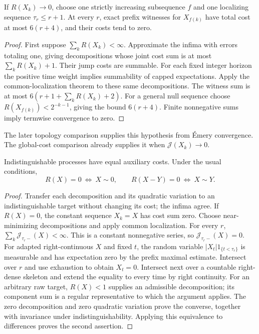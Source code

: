 \begin{lemma}
If $R(X_k)\to0$, choose one strictly increasing subsequence $f$ and one
localizing sequence $\tau_r\leq r+1$. At every $r$, exact prefix witnesses
for $X_{f(k)}$ have total cost at most $6(r+4)$, and their costs tend to zero.
\end{lemma}
\begin{proof}
First suppose $\sum_kR(X_k)<\infty$. Approximate the infima with errors
totaling one, giving decompositions whose joint cost sum is at most
$\sum_kR(X_k)+1$. Their jump costs are summable. For each fixed integer
horizon the positive time weight implies summability of capped expectations.
Apply the common-localization theorem to these same decompositions.
The witness sum is at most $6(r+1+\sum_kR(X_k)+2)$.
For a general null sequence choose $R(X_{f(k)})<2^{-k-1}$, giving the bound
$6(r+4)$. Finite nonnegative sums imply termwise convergence to zero.
\end{proof}
The later topology comparison supplies this hypothesis from Émery convergence.
The global-cost comparison already supplies it when $\mathcal J(X_k)\to0$.
\begin{lemma}[Separation]
Indistinguishable processes have equal auxiliary costs. Under the usual conditions,
\[
 R(X)=0\ \Longleftrightarrow\ X\sim0,\qquad
 R(X-Y)=0\ \Longleftrightarrow\ X\sim Y.
\]
\end{lemma}
\begin{proof}
Transfer each decomposition and its quadratic variation to an
indistinguishable target without changing its cost; the infima agree.
If $R(X)=0$, the constant sequence $X_k=X$ has cost sum zero.
Choose near-minimizing decompositions and apply common localization.
For every $r$, $\sum_k\mathcal J_{\tau_r-}(X)<\infty$.
This is a constant nonnegative series, so $\mathcal J_{\tau_r-}(X)=0$.
For adapted right-continuous $X$ and fixed $t$, the random variable
$|X_t|1_{\{t<\tau_r\}}$ is measurable and has expectation zero by the
prefix maximal estimate. Intersect over $r$ and use exhaustion to obtain
$X_t=0$. Intersect next over a countable right-dense skeleton and extend
the equality to every time by right continuity.
For an arbitrary raw target, $R(X)<1$ supplies an admissible decomposition;
its component sum is a regular representative to which the argument applies.
The zero decomposition and zero quadratic variation prove the converse,
together with invariance under indistinguishability. Applying this equivalence
to differences proves the second assertion.
\end{proof}
